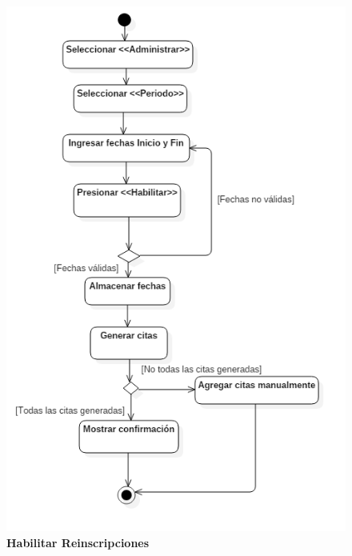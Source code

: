 \begin{figure}[H]
  \centering
    \includegraphics[scale=.68,angle=0]{project/Actividades/habilitar_reinscripciones.png}
  \caption{\textbf{Habilitar Reinscripciones}}
\end{figure}
